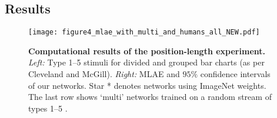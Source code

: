 % 
% 
%
%
%

\vspace{-0.1cm}
\subsection{Results}

\begin{figure}[t]
  \centering
  \texttt{[image: figure4\_mlae\_with\_multi\_and\_humans\_all\_NEW.pdf]}
  \caption{\textbf{Computational results of the position-length experiment.} \textit{Left:} Type 1--5 stimuli for divided and grouped bar charts (as per Cleveland and McGill). \textit{Right:} MLAE and  $95\%$ confidence intervals of our networks. Star * denotes networks using ImageNet weights. The last row shows `multi' networks trained on a random stream of types 1--5 . }
  \label{fig:figure4_mlae}
\end{figure}

